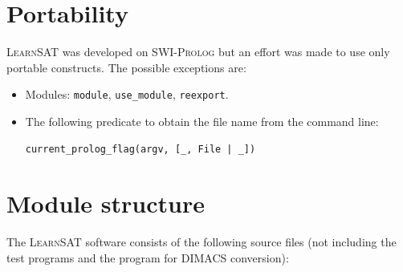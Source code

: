 \documentclass[11pt]{article}
\newcommand*{\p}[1]{\textup{\texttt{#1}}}
\newcommand*{\ls}{\textsc{LearnSAT}}
\newcommand*{\sw}{\textsc{SWI-Prolog}}
\begin{document}
\section{Portability}\label{s.port}

\ls{} was developed on \sw{} but an effort was made to use only portable
constructs. The possible exceptions are:

\begin{itemize}
\item Modules: \p{module}, \p{use\_module}, \p{reexport}.
\item The following predicate to obtain the file name from the command
line:
\begin{verbatim}
current_prolog_flag(argv, [_, File | _])
\end{verbatim}
\end{itemize}

\newpage


\section{Module structure}

The \ls{} software consists of the following source files (not including
the test programs and the program for DIMACS conversion):
\end{document}
